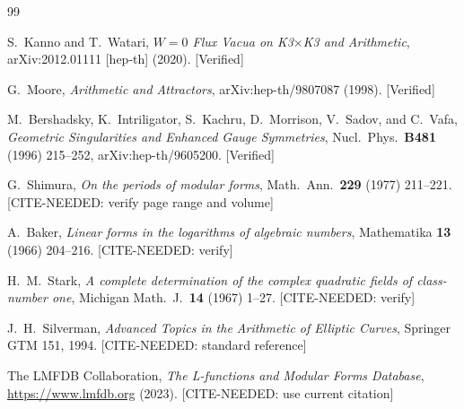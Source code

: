 \documentclass[12pt,a4paper]{article}
\theoremstyle{plain}
\theoremstyle{definition}
\begin{document}
\begin{thebibliography}{99}

S.~Kanno and T.~Watari,
\textit{$W=0$ Flux Vacua on K3$\times$K3 and Arithmetic},
arXiv:2012.01111 [hep-th] (2020). [Verified]

G.~Moore,
\textit{Arithmetic and Attractors},
arXiv:hep-th/9807087 (1998). [Verified]

M.~Bershadsky, K.~Intriligator, S.~Kachru, D.~Morrison, V.~Sadov, and C.~Vafa,
\textit{Geometric Singularities and Enhanced Gauge Symmetries},
Nucl.\ Phys.\ \textbf{B481} (1996) 215--252,
arXiv:hep-th/9605200. [Verified]

G.~Shimura,
\textit{On the periods of modular forms},
Math.\ Ann.\ \textbf{229} (1977) 211--221. [CITE-NEEDED: verify page range and volume]

A.~Baker,
\textit{Linear forms in the logarithms of algebraic numbers},
Mathematika \textbf{13} (1966) 204--216. [CITE-NEEDED: verify]

H.~M.~Stark,
\textit{A complete determination of the complex quadratic fields of class-number one},
Michigan Math.\ J.\ \textbf{14} (1967) 1--27. [CITE-NEEDED: verify]

J.~H.~Silverman,
\textit{Advanced Topics in the Arithmetic of Elliptic Curves},
Springer GTM 151, 1994. [CITE-NEEDED: standard reference]

The LMFDB Collaboration,
\textit{The L-functions and Modular Forms Database},
\url{https://www.lmfdb.org} (2023). [CITE-NEEDED: use current citation]

\end{thebibliography}
\end{document}
